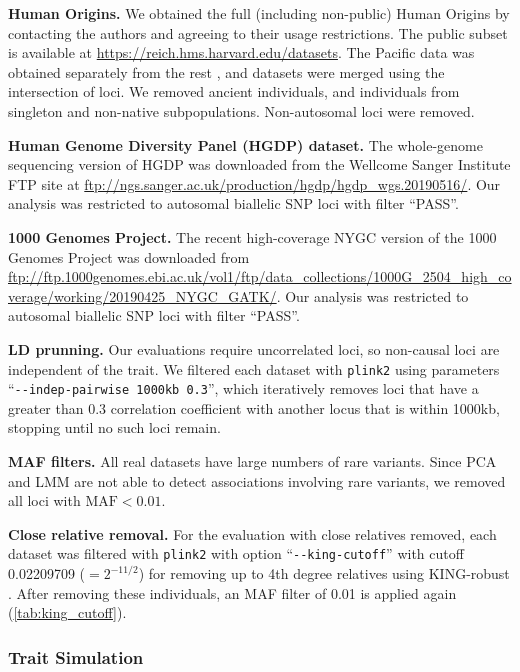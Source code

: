 \documentclass[11pt]{article}
\begin{document}
\textbf{Human Origins.}
We obtained the full (including non-public) Human Origins by contacting the authors and agreeing to their usage restrictions.
The public subset is available at \url{https://reich.hms.harvard.edu/datasets}.
The Pacific data \citep{skoglund_genomic_2016} was obtained separately from the rest \citep{lazaridis_ancient_2014,lazaridis_genomic_2016}, and datasets were merged using the intersection of loci.
We removed ancient individuals, and individuals from singleton and non-native subpopulations.
Non-autosomal loci were removed.

\textbf{Human Genome Diversity Panel (HGDP) dataset.}
The whole-genome sequencing version of HGDP \citep{bergstrom_insights_2020} was downloaded from the Wellcome Sanger Institute FTP site at \url{ftp://ngs.sanger.ac.uk/production/hgdp/hgdp_wgs.20190516/}.
Our analysis was restricted to autosomal biallelic SNP loci with filter ``PASS''.

\textbf{1000 Genomes Project.}
The recent high-coverage NYGC version of the 1000 Genomes Project \citep{fairley_international_2020} was downloaded from \url{ftp://ftp.1000genomes.ebi.ac.uk/vol1/ftp/data_collections/1000G_2504_high_coverage/working/20190425_NYGC_GATK/}.
Our analysis was restricted to autosomal biallelic SNP loci with filter ``PASS''.

\textbf{LD prunning.}
Our evaluations require uncorrelated loci, so non-causal loci are independent of the trait.
We filtered each dataset with \texttt{plink2} using parameters ``\texttt{-{}-indep-pairwise 1000kb 0.3}'', which iteratively removes loci that have a greater than 0.3 correlation coefficient with another locus that is within 1000kb, stopping until no such loci remain.

\textbf{MAF filters.}
All real datasets have large numbers of rare variants.
Since PCA and LMM are not able to detect associations involving rare variants, we removed all loci with $\text{MAF} < 0.01$.

\textbf{Close relative removal.}
For the evaluation with close relatives removed, each dataset was filtered with \texttt{plink2} with option ``\texttt{-{}-king-cutoff}'' with cutoff 0.02209709 ($= 2^{-11/2}$) for removing up to 4th degree relatives using KING-robust \citep{manichaikul_robust_2010}.
After removing these individuals, an MAF filter of 0.01 is applied again (\cref{tab:king_cutoff}).

\subsubsection{Trait Simulation}
\end{document}
